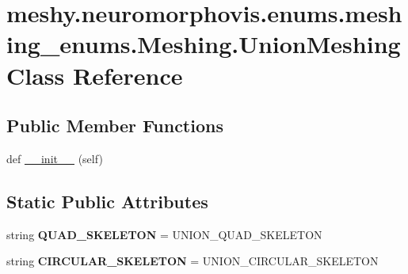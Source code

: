 \hypertarget{classmeshy_1_1neuromorphovis_1_1enums_1_1meshing__enums_1_1Meshing_1_1UnionMeshing}{}\section{meshy.\+neuromorphovis.\+enums.\+meshing\+\_\+enums.\+Meshing.\+Union\+Meshing Class Reference}
\label{classmeshy_1_1neuromorphovis_1_1enums_1_1meshing__enums_1_1Meshing_1_1UnionMeshing}


 


\subsection*{Public Member Functions}
\begin{DoxyCompactItemize}
\item 
def \hyperlink{classmeshy_1_1neuromorphovis_1_1enums_1_1meshing__enums_1_1Meshing_1_1UnionMeshing_a2dafda484edd4075ee43d8d1eb6edb8b}{\+\_\+\+\_\+init\+\_\+\+\_\+} (self)\hypertarget{classmeshy_1_1neuromorphovis_1_1enums_1_1meshing__enums_1_1Meshing_1_1UnionMeshing_a2dafda484edd4075ee43d8d1eb6edb8b}{}\label{classmeshy_1_1neuromorphovis_1_1enums_1_1meshing__enums_1_1Meshing_1_1UnionMeshing_a2dafda484edd4075ee43d8d1eb6edb8b}

\end{DoxyCompactItemize}
\subsection*{Static Public Attributes}
\begin{DoxyCompactItemize}
\item 
string {\bfseries Q\+U\+A\+D\+\_\+\+S\+K\+E\+L\+E\+T\+ON} = \textquotesingle{}U\+N\+I\+O\+N\+\_\+\+Q\+U\+A\+D\+\_\+\+S\+K\+E\+L\+E\+T\+ON\textquotesingle{}\hypertarget{classmeshy_1_1neuromorphovis_1_1enums_1_1meshing__enums_1_1Meshing_1_1UnionMeshing_a2039584a7687267a72c90324230642be}{}\label{classmeshy_1_1neuromorphovis_1_1enums_1_1meshing__enums_1_1Meshing_1_1UnionMeshing_a2039584a7687267a72c90324230642be}

\item 
string {\bfseries C\+I\+R\+C\+U\+L\+A\+R\+\_\+\+S\+K\+E\+L\+E\+T\+ON} = \textquotesingle{}U\+N\+I\+O\+N\+\_\+\+C\+I\+R\+C\+U\+L\+A\+R\+\_\+\+S\+K\+E\+L\+E\+T\+ON\textquotesingle{}\hypertarget{classmeshy_1_1neuromorphovis_1_1enums_1_1meshing__enums_1_1Meshing_1_1UnionMeshing_a14c239ac5b12fb342e6da47482d053d9}{}\label{classmeshy_1_1neuromorphovis_1_1enums_1_1meshing__enums_1_1Meshing_1_1UnionMeshing_a14c239ac5b12fb342e6da47482d053d9}

\end{DoxyCompactItemize}


